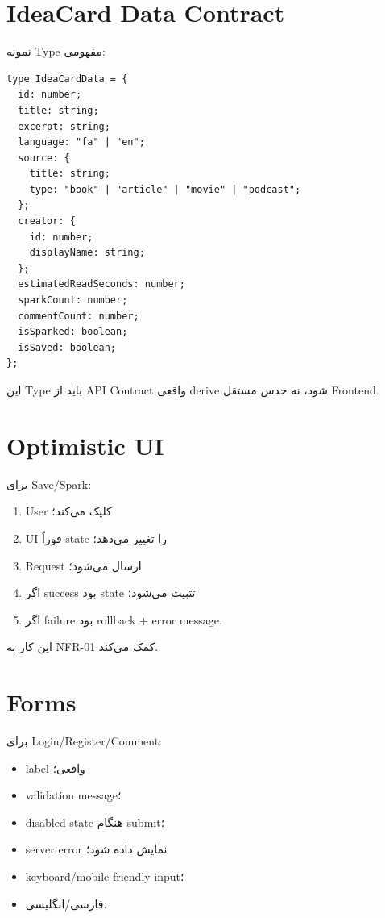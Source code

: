 \section{IdeaCard Data Contract}

نمونه Type مفهومی:
\begin{latin}
\begin{lstlisting}
type IdeaCardData = {
  id: number;
  title: string;
  excerpt: string;
  language: "fa" | "en";
  source: {
    title: string;
    type: "book" | "article" | "movie" | "podcast";
  };
  creator: {
    id: number;
    displayName: string;
  };
  estimatedReadSeconds: number;
  sparkCount: number;
  commentCount: number;
  isSparked: boolean;
  isSaved: boolean;
};
\end{lstlisting}
\end{latin}

این Type باید از API Contract واقعی derive شود، نه حدس مستقل Frontend.

\section{Optimistic UI}

برای Save/Spark:
\begin{enumerate}
  \item User کلیک می‌کند؛
  \item UI فوراً state را تغییر می‌دهد؛
  \item Request ارسال می‌شود؛
  \item اگر success بود state تثبیت می‌شود؛
  \item اگر failure بود rollback + error message.
\end{enumerate}

این کار به NFR-01 کمک می‌کند.

\section{Forms}

برای Login/Register/Comment:
\begin{itemize}
  \item label واقعی؛
  \item validation message؛
  \item disabled state هنگام submit؛
  \item server error نمایش داده شود؛
  \item keyboard/mobile-friendly input؛
  \item فارسی/انگلیسی.
\end{itemize}

